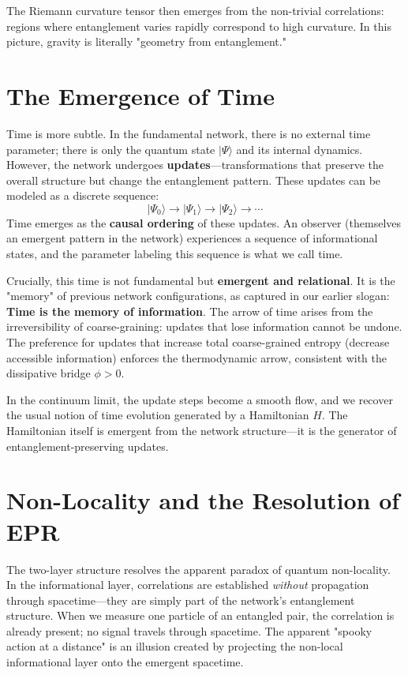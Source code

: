 \documentclass[12pt,a4paper]{book}
\begin{document}
The Riemann curvature tensor then emerges from the non-trivial correlations: regions where entanglement varies rapidly correspond to high curvature. In this picture, gravity is literally "geometry from entanglement."

\section{The Emergence of Time}

Time is more subtle. In the fundamental network, there is no external time parameter; there is only the quantum state $|\Psi\rangle$ and its internal dynamics. However, the network undergoes \textbf{updates}—transformations that preserve the overall structure but change the entanglement pattern. These updates can be modeled as a discrete sequence:
\begin{equation}
    |\Psi_0\rangle \rightarrow |\Psi_1\rangle \rightarrow |\Psi_2\rangle \rightarrow \cdots
\end{equation}
Time emerges as the \textbf{causal ordering} of these updates. An observer (themselves an emergent pattern in the network) experiences a sequence of informational states, and the parameter labeling this sequence is what we call time.

Crucially, this time is not fundamental but \textbf{emergent and relational}. It is the "memory" of previous network configurations, as captured in our earlier slogan: \textbf{Time is the memory of information}. The arrow of time arises from the irreversibility of coarse-graining: updates that lose information cannot be undone. The preference for updates that increase total coarse-grained entropy (decrease accessible information) enforces the thermodynamic arrow, consistent with the dissipative bridge $\phi > 0$.

In the continuum limit, the update steps become a smooth flow, and we recover the usual notion of time evolution generated by a Hamiltonian $H$. The Hamiltonian itself is emergent from the network structure—it is the generator of entanglement-preserving updates.

\section{Non-Locality and the Resolution of EPR}

The two-layer structure resolves the apparent paradox of quantum non-locality. In the informational layer, correlations are established \textit{without} propagation through spacetime—they are simply part of the network's entanglement structure. When we measure one particle of an entangled pair, the correlation is already present; no signal travels through spacetime. The apparent "spooky action at a distance" is an illusion created by projecting the non-local informational layer onto the emergent spacetime.
\end{document}
